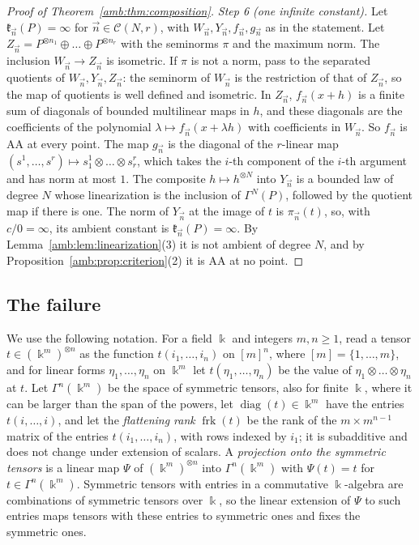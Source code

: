 \documentclass[11pt]{amsart}
\theoremstyle{definition}
\theoremstyle{remark}
\numberwithin{equation}{section}
\theoremstyle{plain}
\theoremstyle{definition}
\theoremstyle{plain}
\begin{document}
\begin{proof}[Proof of Theorem~\ref{amb:thm:composition}]
\emph{Step 6 (one infinite constant).} Let $\mathfrak k_{\vec n}(P)=\infty$ for $\vec n\in\mathcal C(N,r)$, with $W_{\vec n},Y_{\vec n},f_{\vec n},g_{\vec n}$ as in the statement. Let $Z_{\vec n}=P^{\otimes n_1}\oplus\dots\oplus P^{\otimes n_r}$ with the seminorms $\pi$ and the maximum norm. The inclusion $W_{\vec n}\to Z_{\vec n}$ is isometric. If $\pi$ is not a norm, pass to the separated quotients of $W_{\vec n},Y_{\vec n},Z_{\vec n}$: the seminorm of $W_{\vec n}$ is the restriction of that of $Z_{\vec n}$, so the map of quotients is well defined and isometric. In $Z_{\vec n}$, $f_{\vec n}(x+h)$ is a finite sum of diagonals of bounded multilinear maps in $h$, and these diagonals are the coefficients of the polynomial $\lambda\mapsto f_{\vec n}(x+\lambda h)$ with coefficients in $W_{\vec n}$. So $f_{\vec n}$ is AA at every point. The map $g_{\vec n}$ is the diagonal of the $r$-linear map $(s^1,\dots,s^r)\mapsto s^1_1\otimes\dots\otimes s^r_r$, which takes the $i$-th component of the $i$-th argument and has norm at most $1$. The composite $h\mapsto h^{\otimes N}$ into $Y_{\vec n}$ is a bounded law of degree $N$ whose linearization is the inclusion of $\Gamma^N(P)$, followed by the quotient map if there is one. The norm of $Y_{\vec n}$ at the image of $t$ is $\pi_{\vec n}(t)$, so, with $c/0=\infty$, its ambient constant is $\mathfrak k_{\vec n}(P)=\infty$. By Lemma~\ref{amb:lem:linearization}(3) it is not ambient of degree $N$, and by Proposition~\ref{amb:prop:criterion}(2) it is AA at no point.
\end{proof}

\subsection{The failure}\label{amb:ssec:proofs-failure}

We use the following notation. For a field $\Bbbk$ and integers
$m,n\ge1$, read a tensor $t\in(\Bbbk^m)^{\otimes n}$ as the function
$t(i_1,\dots,i_n)$ on $[m]^n$, where $[m]=\{1,\dots,m\}$, and for linear forms $\eta_1,\dots,\eta_n$ on $\Bbbk^m$ let $t(\eta_1,\dots,\eta_n)$ be
the value of $\eta_1\otimes\dots\otimes\eta_n$ at $t$. Let $\Gamma^n(\Bbbk^m)$ be the space of symmetric tensors, also for finite $\Bbbk$, where it can be larger than the span of the powers, let
$\operatorname{diag}(t)\in\Bbbk^m$ have the entries $t(i,\dots,i)$, and let the \emph{flattening rank}
$\operatorname{frk}(t)$ be the rank of the $m\times m^{n-1}$ matrix of the entries $t(i_1,\dots,i_n)$, with rows indexed by
$i_1$; it is subadditive and does not change under extension of scalars. A \emph{projection onto the symmetric tensors}
is a linear map $\Psi$ of $(\Bbbk^m)^{\otimes n}$ into $\Gamma^n(\Bbbk^m)$ with $\Psi(t)=t$ for $t\in\Gamma^n(\Bbbk^m)$.
Symmetric tensors with entries in a commutative $\Bbbk$\nobreakdash-algebra are combinations of symmetric tensors over
$\Bbbk$, so the linear extension of $\Psi$ to such entries maps tensors with these entries to symmetric ones and fixes
the symmetric ones.
\end{document}
